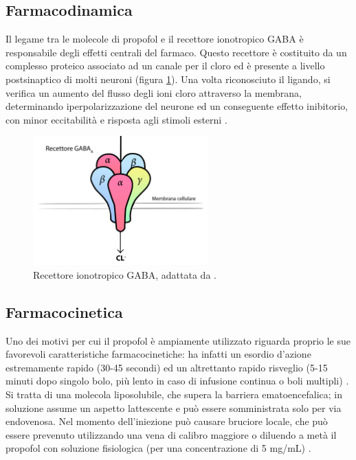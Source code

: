 \subsection*{Farmacodinamica}

Il legame tra le molecole di propofol e il recettore ionotropico GABA è responsabile degli effetti centrali del farmaco. Questo recettore è costituito da un complesso proteico associato ad un canale per il cloro ed è presente a livello postsinaptico di molti neuroni (figura \ref{fig:GABAps}). Una volta riconosciuto il ligando, si verifica un aumento del flusso degli ioni cloro attraverso la membrana, determinando iperpolarizzazione del neurone ed un conseguente effetto inibitorio, con minor eccitabilità e risposta agli stimoli esterni \cite{Propofol2015}.

\bigskip

\begin{figure}[h]
    \centering
    \includegraphics[width=0.6\textwidth]{Figure/GABAps.jpg}
    \caption{Recettore ionotropico GABA, adattata da \cite{vinkers2012}.}
    \label{fig:GABAps}
\end{figure}

\subsection*{Farmacocinetica}

Uno dei motivi per cui il propofol è ampiamente utilizzato riguarda proprio le sue favorevoli caratteristiche farmacocinetiche: ha infatti un esordio d'azione estremamente rapido (30-45 secondi) ed un altrettanto rapido risveglio (5-15 minuti dopo singolo bolo, più lento in caso di infusione continua o boli multipli) \cite{Simeupsedazione, Uptodatepharmacology}. Si tratta di una molecola liposolubile, che supera la barriera ematoencefalica; in soluzione assume un aspetto lattescente e può essere somministrata solo per via endovenosa. Nel momento dell'iniezione può causare bruciore locale, che può essere prevenuto utilizzando una vena di calibro maggiore o diluendo a metà il propofol con soluzione fisiologica (per una concentrazione di 5 mg/mL) \cite{Simeupsedazione}. 

